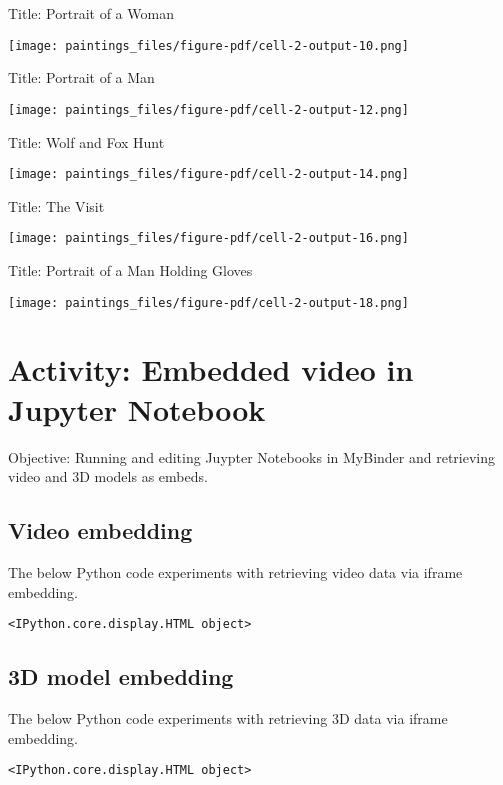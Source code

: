 \documentclass[
  letterpaper,
]{book}
\begin{document}
Title: Portrait of a Woman

\texttt{[image: paintings\_files/figure-pdf/cell-2-output-10.png]}

Title: Portrait of a Man

\texttt{[image: paintings\_files/figure-pdf/cell-2-output-12.png]}

Title: Wolf and Fox Hunt

\texttt{[image: paintings\_files/figure-pdf/cell-2-output-14.png]}

Title: The Visit

\texttt{[image: paintings\_files/figure-pdf/cell-2-output-16.png]}

Title: Portrait of a Man Holding Gloves

\texttt{[image: paintings\_files/figure-pdf/cell-2-output-18.png]}


\hypertarget{activity-embedded-video-in-jupyter-notebook}{%
\chapter{Activity: Embedded video in Jupyter
Notebook}\label{activity-embedded-video-in-jupyter-notebook}}

Objective: Running and editing Juypter Notebooks in MyBinder and
retrieving video and 3D models as embeds.

\hypertarget{video-embedding}{%
\section{Video embedding}\label{video-embedding}}

The below Python code experiments with retrieving video data via iframe
embedding.

\begin{verbatim}
<IPython.core.display.HTML object>
\end{verbatim}

\hypertarget{d-model-embedding}{%
\section{3D model embedding}\label{d-model-embedding}}

The below Python code experiments with retrieving 3D data via iframe
embedding.

\begin{verbatim}
<IPython.core.display.HTML object>
\end{verbatim}
\end{document}
